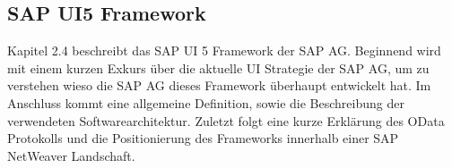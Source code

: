 %
%    


\subsection{SAP UI5 Framework}
Kapitel 2.4 beschreibt das SAP UI 5 Framework der SAP AG. Beginnend wird mit einem kurzen Exkurs über die aktuelle UI Strategie der SAP AG, um zu verstehen wieso die SAP AG dieses Framework überhaupt entwickelt hat. Im Anschluss kommt eine allgemeine Definition, sowie die Beschreibung der verwendeten Softwarearchitektur. Zuletzt folgt eine kurze Erklärung des OData Protokolls und die Positionierung des Frameworks innerhalb einer SAP NetWeaver Landschaft.

